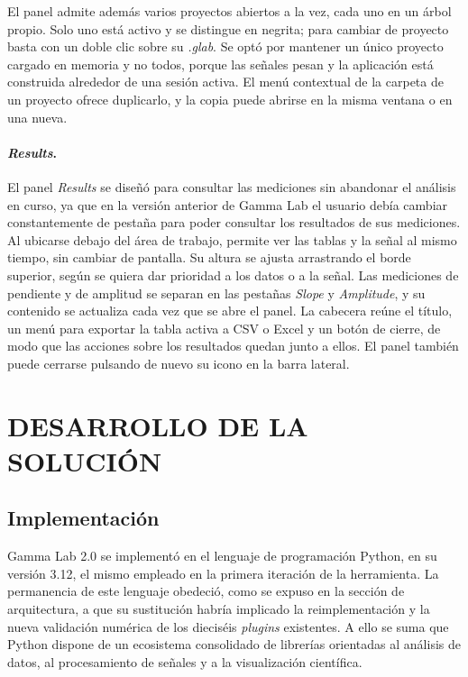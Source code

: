 \documentclass[12pt,letterpaper,oneside]{article}
\newcommand{\capitulo}[1]{\clearpage\section{#1}}
\begin{document}
El panel admite además varios proyectos abiertos a la vez, cada uno en un árbol propio. Solo uno está activo y se distingue en negrita; para cambiar de proyecto basta con un doble clic sobre su \textit{.glab}. Se optó por mantener un único proyecto cargado en memoria y no todos, porque las señales pesan y la aplicación está construida alrededor de una sesión activa. El menú contextual de la carpeta de un proyecto ofrece duplicarlo, y la copia puede abrirse en la misma ventana o en una nueva.

\paragraph{\textit{Results}.} El panel \textit{Results} se diseñó para consultar las mediciones sin abandonar el análisis en curso, ya que en la versión anterior de Gamma Lab el usuario debía cambiar constantemente de pestaña para poder consultar los resultados de sus mediciones. Al ubicarse debajo del área de trabajo, permite ver las tablas y la señal al mismo tiempo, sin cambiar de pantalla. Su altura se ajusta arrastrando el borde superior, según se quiera dar prioridad a los datos o a la señal. Las mediciones de pendiente y de amplitud se separan en las pestañas \textit{Slope} y \textit{Amplitude}, y su contenido se actualiza cada vez que se abre el panel. La cabecera reúne el título, un menú para exportar la tabla activa a CSV o Excel y un botón de cierre, de modo que las acciones sobre los resultados quedan junto a ellos. El panel también puede cerrarse pulsando de nuevo su icono en la barra lateral.


\capitulo{DESARROLLO DE LA SOLUCIÓN}

\subsection{Implementación}
Gamma Lab 2.0 se implementó en el lenguaje de programación Python, en su versión 3.12, el mismo empleado en la primera iteración de la herramienta. La permanencia de este lenguaje obedeció, como se expuso en la sección de arquitectura, a que su sustitución habría implicado la reimplementación y la nueva validación numérica de los dieciséis \textit{plugins} existentes. A ello se suma que Python dispone de un ecosistema consolidado de librerías orientadas al análisis de datos, al procesamiento de señales y a la visualización científica. 
\end{document}

